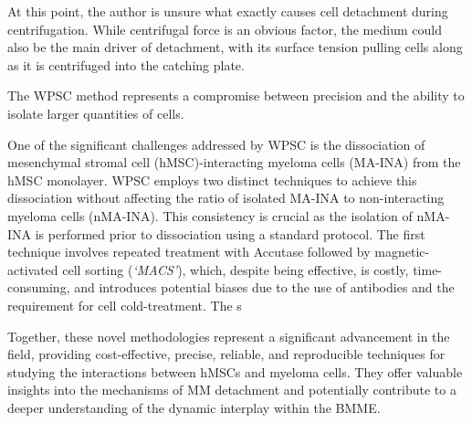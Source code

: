 At this point, the author is unsure what exactly causes cell detachment during
centrifugation. While centrifugal force is an obvious factor, the medium could
also be the main driver of detachment, with its surface tension pulling
cells along as it is centrifuged into the catching plate.


The WPSC method represents a compromise between precision and the ability to
isolate larger quantities of cells.


One of the significant challenges addressed by WPSC is the dissociation of
mesenchymal stromal cell (hMSC)-interacting myeloma cells (MA-INA) from the hMSC
monolayer. WPSC employs two distinct techniques to achieve this dissociation
without affecting the ratio of isolated MA-INA to non-interacting myeloma cells
(nMA-INA). This consistency is crucial as the isolation of nMA-INA is performed
prior to dissociation using a standard protocol. The first technique involves
repeated treatment with Accutase followed by magnetic-activated cell sorting
(\emph{`MACS'}), which, despite being effective, is costly, time-consuming, and
introduces potential biases due to the use of antibodies and the requirement for
cell cold-treatment. The s






Together, these novel methodologies represent a significant advancement in the
field, providing cost-effective, precise, reliable, and reproducible techniques
for studying the interactions between \acp{hMSC} and myeloma cells. They offer
valuable insights into the mechanisms of MM detachment and potentially
contribute to a deeper understanding of the dynamic interplay within the BMME.




